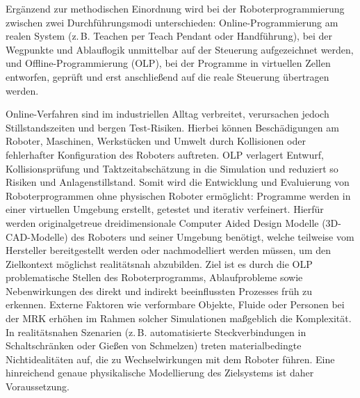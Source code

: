 Ergänzend zur methodischen Einordnung
wird bei der Roboterprogrammierung zwischen zwei
Durchführungsmodi unterschieden:
Online-Programmierung am realen System (z.\,B. Teachen per Teach
Pendant oder Handführung), bei der Wegpunkte und Ablauflogik
unmittelbar auf der Steuerung aufgezeichnet werden, und
Offline-Programmierung (OLP), bei der Programme in
virtuellen Zellen entworfen, geprüft und erst anschließend auf die
reale Steuerung übertragen
werden.

Online-Verfahren sind im industriellen Alltag verbreitet, verursachen
jedoch Stillstandszeiten und bergen
Test-Risiken. Hierbei können Beschädigungen am
Roboter, Maschinen, Werkstücken und Umwelt durch Kollisionen oder fehlerhafter
Konfiguration des Roboters auftreten. OLP verlagert
Entwurf, Kollisionsprüfung und Taktzeitabschätzung in die Simulation
und reduziert so Risiken und Anlagenstillstand.
Somit wird die Entwicklung und Evaluierung
von Roboterprogrammen ohne physischen Roboter
ermöglicht: Programme werden in einer virtuellen Umgebung
erstellt, getestet und
iterativ verfeinert. Hierfür werden originalgetreue dreidimensionale
Computer Aided Design Modelle (3D-CAD-Modelle) des Roboters
und seiner Umgebung benötigt, welche teilweise vom Hersteller
bereitgestellt werden oder nachmodelliert werden müssen, um den
Zielkontext möglichst realitätsnah abzubilden. Ziel ist es durch die OLP
problematische Stellen des Roboterprogramms, Ablaufprobleme sowie
Nebenwirkungen des direkt und indirekt beeinflussten
Prozesses früh zu erkennen. Externe
Faktoren wie verformbare Objekte, Fluide oder Personen bei der MRK erhöhen im
Rahmen solcher Simulationen maßgeblich die
Komplexität. In realitätsnahen Szenarien (z.\,B. automatisierte
Steckverbindungen in Schaltschränken oder Gießen von Schmelzen) treten
materialbedingte Nichtidealitäten auf, die zu Wechselwirkungen mit dem Roboter
führen. Eine hinreichend genaue physikalische Modellierung des Zielsystems ist
daher Voraussetzung.


